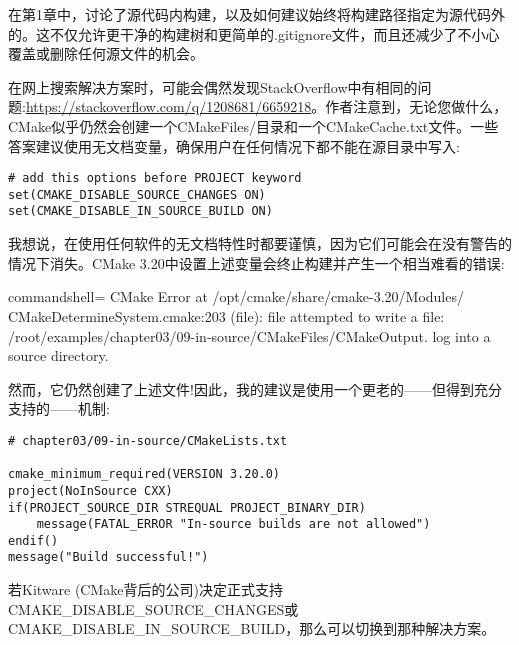 在第1章中，讨论了源代码内构建，以及如何建议始终将构建路径指定为源代码外的。这不仅允许更干净的构建树和更简单的.gitignore文件，而且还减少了不小心覆盖或删除任何源文件的机会。

在网上搜索解决方案时，可能会偶然发现StackOverflow中有相同的问题:\url{https://stackoverflow.com/q/1208681/6659218}。作者注意到，无论您做什么，CMake似乎仍然会创建一个CMakeFiles/目录和一个CMakeCache.txt文件。一些答案建议使用无文档变量，确保用户在任何情况下都不能在源目录中写入:

\begin{lstlisting}[style=styleCMake]
# add this options before PROJECT keyword
set(CMAKE_DISABLE_SOURCE_CHANGES ON)
set(CMAKE_DISABLE_IN_SOURCE_BUILD ON)
\end{lstlisting}

我想说，在使用任何软件的无文档特性时都要谨慎，因为它们可能会在没有警告的情况下消失。CMake 3.20中设置上述变量会终止构建并产生一个相当难看的错误:

\begin{tcblisting}{commandshell={}}
CMake Error at /opt/cmake/share/cmake-3.20/Modules/
CMakeDetermineSystem.cmake:203 (file):
  file attempted to write a file:
  /root/examples/chapter03/09-in-source/CMakeFiles/CMakeOutput.
log into a source
  directory.
\end{tcblisting}

然而，它仍然创建了上述文件!因此，我的建议是使用一个更老的——但得到充分支持的——机制:

\begin{lstlisting}[style=styleCMake]
# chapter03/09-in-source/CMakeLists.txt

cmake_minimum_required(VERSION 3.20.0)
project(NoInSource CXX)
if(PROJECT_SOURCE_DIR STREQUAL PROJECT_BINARY_DIR)
	message(FATAL_ERROR "In-source builds are not allowed")
endif()
message("Build successful!")
\end{lstlisting}

若Kitware (CMake背后的公司)决定正式支持CMAKE\_DISABLE\_SOURCE\_CHANGES或CMAKE\_DISABLE\_IN\_SOURCE\_BUILD，那么可以切换到那种解决方案。














